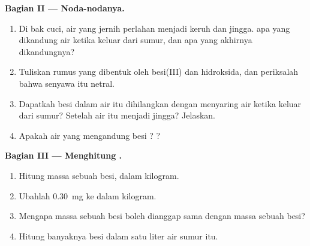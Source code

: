 \begin{problem}
\medskip
\noindent\textbf{Bagian II --- Noda-nodanya.}
\begin{enumerate}[resume]
  \item Di bak cuci, air yang jernih perlahan menjadi keruh dan jingga.
         apa yang dikandung air ketika keluar dari sumur, dan  apa
        yang akhirnya dikandungnya?
  \item Tuliskan rumus  yang dibentuk oleh  besi(III) dan
         hidroksida, dan periksalah bahwa senyawa itu netral.
  \item Dapatkah besi dalam air itu dihilangkan dengan menyaring air
        ketika keluar dari sumur? Setelah air itu menjadi jingga?
        Jelaskan.
  \item Apakah air yang mengandung  besi ? ?
\end{enumerate}

\medskip
\noindent\textbf{Bagian III --- Menghitung .}
\begin{enumerate}[resume]
  \item Hitung massa sebuah  besi, dalam kilogram.
  \item Ubahlah \qty{0.30}{mg} ke dalam kilogram.
  \item Mengapa massa sebuah  besi boleh dianggap sama dengan massa
        sebuah  besi?
  \item Hitung banyaknya  besi dalam satu liter air sumur itu.
\end{enumerate}
\end{problem}
